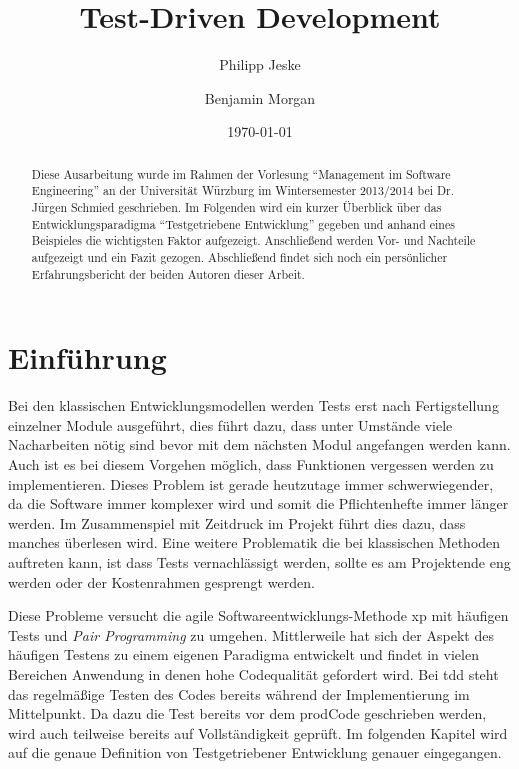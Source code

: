 \documentclass[a4paper,10pt]{scrartcl}
\title{Test-Driven Development}
\author{Philipp Jeske \and Benjamin Morgan}
\date{\today}
\newcommand{\pje}{\marginpar{Philipp\\Jeske}}
\begin{document}
\maketitle

\tableofcontents

\begin{abstract}
 Diese Ausarbeitung wurde im Rahmen der Vorlesung "`Management im Software
 Engineering"' an der Universität Würzburg im Wintersemester 2013/2014 bei Dr.
 Jürgen Schmied geschrieben. Im Folgenden wird ein kurzer Überblick über das
 Entwicklungsparadigma "`Testgetriebene Entwicklung"' gegeben und anhand eines
 Beispieles die wichtigsten Faktor aufgezeigt. Anschließend werden Vor- und
 Nachteile aufgezeigt und ein Fazit gezogen. Abschließend findet sich noch ein
 persönlicher Erfahrungsbericht der beiden Autoren dieser Arbeit.
\end{abstract}

\section{Einführung}\label{Einfuehrung}\pje
Bei den klassischen Entwicklungsmodellen werden Tests erst nach Fertigstellung
einzelner Module ausgeführt, dies führt dazu, dass unter Umstände viele
Nacharbeiten nötig sind bevor mit dem nächsten Modul angefangen werden kann.
Auch ist es bei diesem Vorgehen möglich, dass Funktionen vergessen werden zu
implementieren. Dieses Problem ist gerade heutzutage immer schwerwiegender, da
die Software immer komplexer wird und somit die Pflichtenhefte immer länger
werden. Im Zusammenspiel mit Zeitdruck im Projekt führt dies dazu, dass manches
überlesen wird. Eine weitere Problematik die bei klassischen Methoden
auftreten kann, ist dass Tests vernachlässigt werden, sollte es am Projektende
eng werden oder der Kostenrahmen gesprengt werden.

Diese Probleme versucht die agile Softwareentwicklungs-Methode \gls{xp} mit
häufigen Tests und \emph{Pair Programming} zu umgehen. Mittlerweile hat sich der
Aspekt des häufigen Testens zu einem eigenen Paradigma entwickelt und findet in
vielen Bereichen Anwendung in denen hohe Codequalität gefordert wird. Bei
\gls{tdd} steht das regelmäßige Testen des Codes bereits während der
Implementierung im Mittelpunkt. Da dazu die Test bereits vor dem \gls{prodCode}
geschrieben werden, wird auch teilweise bereits auf Vollständigkeit geprüft. Im
folgenden Kapitel wird auf die genaue Definition von Testgetriebener
Entwicklung genauer eingegangen.
\end{document}
